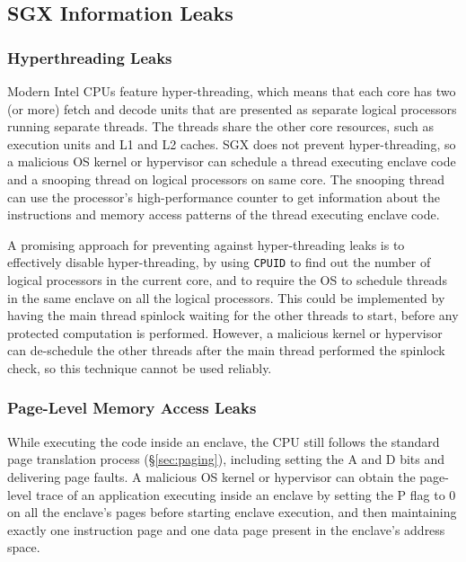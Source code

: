 \subsection{SGX Information Leaks}
\label{sec:sgx_leaks}

\subsubsection{Hyperthreading Leaks}

Modern Intel CPUs feature hyper-threading, which means that each core has two
(or more) fetch and decode units that are presented as separate logical
processors running separate threads. The threads share the other core
resources, such as execution units and L1 and L2 caches. SGX does not prevent
hyper-threading, so a malicious OS kernel or hypervisor can schedule a thread
executing enclave code and a snooping thread on logical processors on same
core. The snooping thread can use the processor's high-performance counter
\cite{petters1999making} to get information about the instructions and memory
access patterns of the thread executing enclave code.

A promising approach for preventing against hyper-threading leaks is to
effectively disable hyper-threading, by using \texttt{CPUID} to find out the
number of logical processors in the current core, and to require the OS to
schedule threads in the same enclave on all the logical processors. This could
be implemented by having the main thread spinlock waiting for the other threads
to start, before any protected computation is performed. However, a malicious
kernel or hypervisor can de-schedule the other threads after the main thread
performed the spinlock check, so this technique cannot be used reliably.

\subsubsection{Page-Level Memory Access Leaks}

While executing the code inside an enclave, the CPU still follows the standard
page translation process (\S \ref{sec:paging}), including setting the A and D
bits and delivering page faults. A malicious OS kernel or hypervisor can
obtain the page-level trace of an application executing inside an enclave by
setting the P flag to 0 on all the enclave's pages before starting enclave
execution, and then maintaining exactly one instruction page and one data page
present in the enclave's address space.

